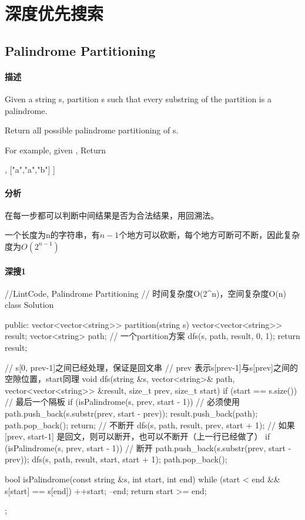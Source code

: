 \chapter{深度优先搜索}


\section{Palindrome Partitioning} %
\label{sec:palindrome-partitioning}


\subsubsection{描述}
Given a string s, partition s such that every substring of the partition is a palindrome.

Return all possible palindrome partitioning of s.

For example, given ,
Return
\begin{Code}
  [
    ["aa","b"],
    ["a","a","b"]
  ]
\end{Code}


\subsubsection{分析}
在每一步都可以判断中间结果是否为合法结果，用回溯法。

一个长度为n的字符串，有$n-1$个地方可以砍断，每个地方可断可不断，因此复杂度为$O(2^{n-1})$


\subsubsection{深搜1}
\begin{Code}
//LintCode, Palindrome Partitioning
// 时间复杂度O(2^n)，空间复杂度O(n)
class Solution {
public:
    vector<vector<string>> partition(string s) {
        vector<vector<string>> result;
        vector<string> path;  // 一个partition方案
        dfs(s, path, result, 0, 1);
        return result;
    }

    // s[0, prev-1]之间已经处理，保证是回文串
    // prev 表示s[prev-1]与s[prev]之间的空隙位置，start同理
    void dfs(string &s, vector<string>& path,
            vector<vector<string>> &result, size_t prev, size_t start) {
        if (start == s.size()) { // 最后一个隔板
            if (isPalindrome(s, prev, start - 1)) { // 必须使用
                path.push_back(s.substr(prev, start - prev));
                result.push_back(path);
                path.pop_back();
            }
            return;
        }
        // 不断开
        dfs(s, path, result, prev, start + 1);
        // 如果[prev, start-1] 是回文，则可以断开，也可以不断开（上一行已经做了）
        if (isPalindrome(s, prev, start - 1)) {
            // 断开
            path.push_back(s.substr(prev, start - prev));
            dfs(s, path, result, start, start + 1);
            path.pop_back();
        }
    }

    bool isPalindrome(const string &s, int start, int end) {
        while (start < end && s[start] == s[end]) {
            ++start;
            --end;
        }
        return start >= end;
    }
};
\end{Code}

